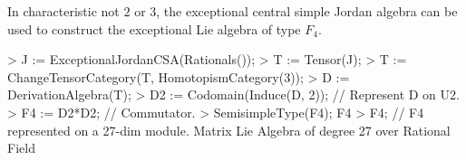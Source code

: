 \begin{example}[ChevalleyShaferF4]
In characteristic not $2$ or $3$, the exceptional central 
simple Jordan algebra can be used to construct
the exceptional Lie algebra of type $F_4$.

\begin{code}
> J := ExceptionalJordanCSA(Rationals());
> T := Tensor(J);                                     
> T := ChangeTensorCategory(T, HomotopismCategory(3));
> D := DerivationAlgebra(T);
> D2 := Codomain(Induce(D, 2));		// Represent D on U2.
> F4 := D2*D2;			              // Commutator.
> SemisimpleType(F4);
F4
> F4;                             // F4 represented on a 27-dim module.
Matrix Lie Algebra of degree 27 over Rational Field
\end{code}
\end{example}

